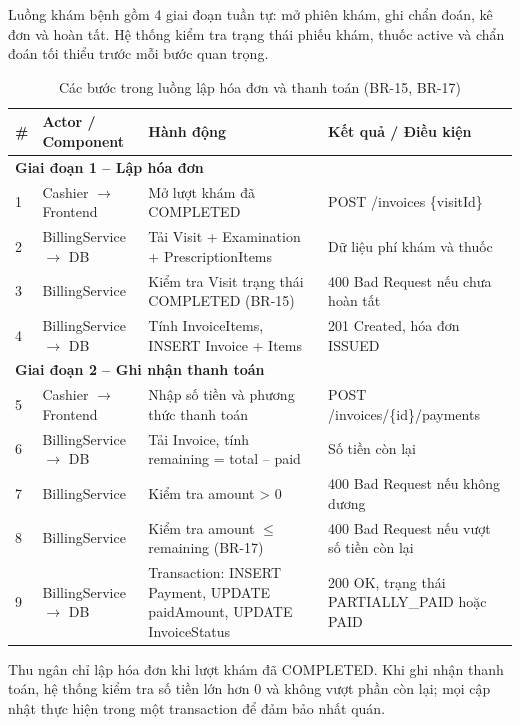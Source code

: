 Luồng khám bệnh gồm 4 giai đoạn tuần tự: mở phiên khám, ghi chẩn đoán, kê đơn và hoàn tất. Hệ thống kiểm tra trạng thái phiếu khám, thuốc active và chẩn đoán tối thiểu trước mỗi bước quan trọng.

\begin{longtable}{|p{0.5cm}|p{3.2cm}|p{5.5cm}|p{4.6cm}|}
\caption{Các bước trong luồng lập hóa đơn và thanh toán (BR-15, BR-17)}\label{tab:payment-sequence}\\
\hline
\textbf{\#} & \textbf{Actor / Component} & \textbf{Hành động} & \textbf{Kết quả / Điều kiện} \\
\hline
\multicolumn{4}{|l|}{\textbf{Giai đoạn 1 -- Lập hóa đơn}} \\
\hline
1 & Cashier $\rightarrow$ Frontend & Mở lượt khám đã COMPLETED & POST /invoices \{visitId\} \\
\hline
2 & BillingService $\rightarrow$ DB & Tải Visit + Examination + PrescriptionItems & Dữ liệu phí khám và thuốc \\
\hline
3 & BillingService & Kiểm tra Visit trạng thái COMPLETED (BR-15) & 400 Bad Request nếu chưa hoàn tất \\
\hline
4 & BillingService $\rightarrow$ DB & Tính InvoiceItems, INSERT Invoice + Items & 201 Created, hóa đơn ISSUED \\
\hline
\multicolumn{4}{|l|}{\textbf{Giai đoạn 2 -- Ghi nhận thanh toán}} \\
\hline
5 & Cashier $\rightarrow$ Frontend & Nhập số tiền và phương thức thanh toán & POST /invoices/\{id\}/payments \\
\hline
6 & BillingService $\rightarrow$ DB & Tải Invoice, tính remaining = total -- paid & Số tiền còn lại \\
\hline
7 & BillingService & Kiểm tra amount > 0 & 400 Bad Request nếu không dương \\
\hline
8 & BillingService & Kiểm tra amount $\leq$ remaining (BR-17) & 400 Bad Request nếu vượt số tiền còn lại \\
\hline
9 & BillingService $\rightarrow$ DB & Transaction: INSERT Payment, UPDATE paidAmount, UPDATE InvoiceStatus & 200 OK, trạng thái PARTIALLY\_PAID hoặc PAID \\
\hline
\end{longtable}

Thu ngân chỉ lập hóa đơn khi lượt khám đã COMPLETED. Khi ghi nhận thanh toán, hệ thống kiểm tra số tiền lớn hơn 0 và không vượt phần còn lại; mọi cập nhật thực hiện trong một transaction để đảm bảo nhất quán.

